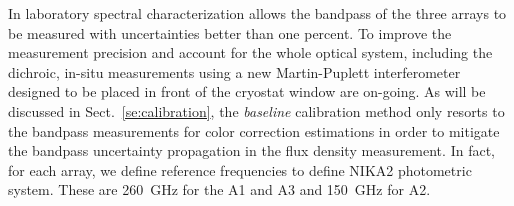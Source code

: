 {\lp In laboratory spectral characterization allows the bandpass of the
three arrays to be measured with uncertainties better than one
percent. To improve the measurement precision and account for the
whole optical system, including the dichroic, in-situ measurements
using a new Martin-Puplett interferometer designed to be placed in
front of the cryostat window are on-going. As will be discussed in
Sect.~\ref{se:calibration}, the \emph{baseline} calibration method
only resorts to the bandpass measurements for color correction
estimations in order to mitigate the bandpass uncertainty propagation
in the flux density measurement.}
In fact, for each array, we define reference frequencies %
to define NIKA2 photometric system. These are 260~GHz for the A1 and A3 and
150~GHz for A2.
